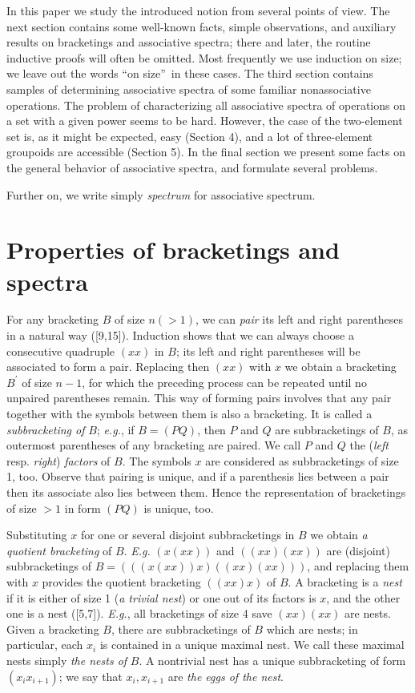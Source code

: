 \documentclass[a4paper,reqno]{amsart}\usepackage{amssymb,latexsym}
\theoremstyle{definition}
\theoremstyle{remark}
\numberwithin{equation}{section}
\numberwithin{theorem}{section}
\begin{document}
In this paper we study the introduced notion from several points of view. The
next section contains some well-known facts, simple observations, and
auxiliary results on bracketings and associative spectra; there and later, the
routine inductive proofs will often be omitted. Most frequently we use
induction on size; we leave out the words \textquotedblleft on
size\textquotedblright\ in these cases. The third section contains samples of
determining associative spectra of some familiar nonassociative operations.
The problem of characterizing all associative spectra of operations on a set
with a given power seems to be hard. However, the case of the two-element set
is, as it might be expected, easy (Section 4), and a lot of three-element
groupoids are accessible (Section 5). In the final section we present some
facts on the general behavior of associative spectra, and formulate several problems.

Further on, we write simply \textit{spectrum} for associative spectrum.

\section{Properties of bracketings and spectra}

For any bracketing $B$ of size $n(>1)$, we can \textit{pair} its left and
right parentheses in a natural way ([9,15]). Induction shows that we can
always choose a consecutive quadruple $(xx)$ in $B$; its left and right
parentheses will be associated to form a pair. Replacing then $(xx)$ with $x$
we obtain a bracketing $B^{\prime}$ of size $n-1$, for which the preceding
process can be repeated until no unpaired parentheses remain. This way of
forming pairs involves that any pair together with the symbols between them is
also a bracketing. It is called a \textit{subbracketing of} $B$;
\textit{e.g.}, if $B=(PQ)$, then $P$ and $Q$ are subbracketings of $B$, as
outermost parentheses of any bracketing are paired. We call $P$ and $Q$ the
(\textit{left} resp. \textit{right}) \textit{factors} of $B$. The symbols $x$
are considered as subbracketings of size 1, too. Observe that pairing is
unique, and if a parenthesis lies between a pair then its associate also lies
between them. Hence the representation of bracketings of size $>1$ in form
$(PQ)$ is unique, too.

Substituting $x$ for one or several disjoint subbracketings in $B$ we obtain
\textit{a quotient bracketing} of $B$. \textit{E.g.} $(x(xx))$ and
$((xx)(xx))$ are (disjoint) subbracketings of $B=(((x(xx))x)((xx)(xx)))$, and
replacing them with $x$ provides the quotient bracketing $((xx)x)$ of $B$. A
bracketing is a \textit{nest} if it is either of size 1 (\textit{a trivial
nest}) or one out of its factors is $x$, and the other one is a nest ([5,7]).
\textit{E.g.}, all bracketings of size 4 save $(xx)(xx)$ are nests. Given a
bracketing $B$, there are subbracketings of $B$ which are nests; in
particular, each $x_{i}$ is contained in a unique maximal nest. We call these
maximal nests simply \textit{the nests of} $B$. A nontrivial nest has a unique
subbracketing of form $(x_{i}x_{i+1})$; we say that $x_{i},x_{i+1}$ are
\textit{the eggs of the nest}.
\end{document}
